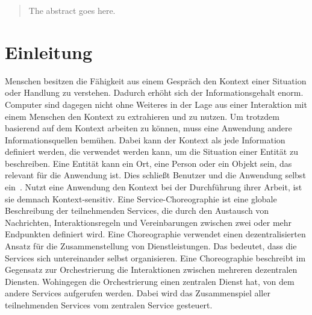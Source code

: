 \documentclass[conference,compsoc]{IEEEtran}
\begin{document}
\begin{abstract}
The abstract goes here.
\end{abstract}





%
\IEEEpeerreviewmaketitle



\section{Einleitung}
Menschen besitzen die Fähigkeit aus einem Gespräch den Kontext einer Situation oder Handlung zu verstehen. Dadurch erhöht sich der Informationsgehalt enorm. Computer sind dagegen nicht ohne Weiteres in der Lage aus einer Interaktion mit einem Menschen den Kontext zu extrahieren und zu nutzen. Um trotzdem basierend auf dem Kontext arbeiten zu können, muss eine Anwendung andere Informationsquellen bemühen. Dabei kann der Kontext als jede Information definiert werden, die verwendet werden kann, um die Situation einer Entität zu beschreiben. Eine Entität kann ein Ort, eine Person oder ein Objekt sein, das relevant für die Anwendung ist. Dies schließt Benutzer und die Anwendung selbst ein~\cite{dey2001understanding}. Nutzt eine Anwendung den Kontext bei der Durchführung ihrer Arbeit, ist sie demnach Kontext-sensitiv.
Eine Service-Choreographie ist eine globale Beschreibung der teilnehmenden Services, die durch den Austausch von Nachrichten, Interaktionsregeln und Vereinbarungen zwischen zwei oder mehr Endpunkten definiert wird. Eine Choreographie verwendet einen dezentralisierten Ansatz für die Zusammenstellung von Dienstleistungen. Das bedeutet, dass die Services sich untereinander selbst organisieren. Eine Choreographie beschreibt im Gegensatz zur Orchestrierung die Interaktionen zwischen mehreren dezentralen Diensten. Wohingegen die Orchestrierung einen zentralen Dienst hat, von dem andere Services aufgerufen werden. Dabei wird das Zusammenspiel aller teilnehmenden Services vom zentralen Service gesteuert.
\end{document}
